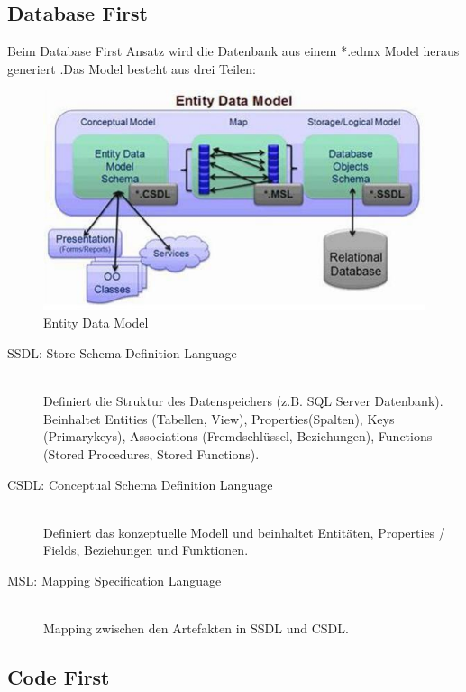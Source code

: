 \subsection{Database First}
Beim Database First Ansatz wird die Datenbank aus einem *.edmx Model heraus generiert .Das Model besteht aus drei Teilen:
\begin{figure}[h]
	\centering
	\includegraphics[width=0.7\linewidth]{images/entity_data_model}
	\caption{Entity Data Model}
	\label{fig:entitydatamodel}
\end{figure}
\begin{description}
	\item[SSDL: Store Schema Definition Language] \hfill \\
	Definiert die Struktur des Datenspeichers (z.B. SQL Server Datenbank). Beinhaltet Entities (Tabellen, View), Properties(Spalten), Keys (Primarykeys), Associations (Fremdschlüssel, Beziehungen), Functions (Stored Procedures, Stored Functions). 
	\item[CSDL: Conceptual Schema Definition Language] \hfill \\
	Definiert das konzeptuelle Modell und beinhaltet Entitäten, Properties / Fields, Beziehungen und Funktionen. 
	\item[MSL: Mapping Specification Language] \hfill \\ 
	Mapping zwischen den Artefakten in SSDL und CSDL.  
\end{description}

\subsection{Code First}
